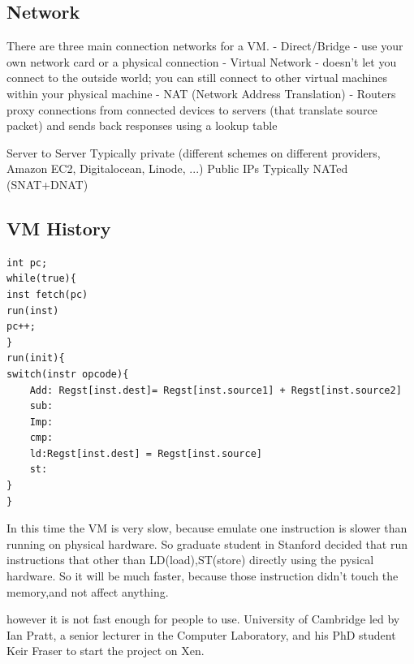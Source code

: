 \documentclass[fancy,11pt,titlestyle=display]{style/elegantbook}
\begin{document}
\subsection*{Network}

There are three main connection networks for a VM.
- Direct/Bridge - use your own network card or a physical connection
- Virtual Network - doesn't let you connect to the outside world; you can still connect to other virtual machines within your physical machine
- NAT (Network Address Translation) - Routers proxy connections from connected devices to servers (that translate source packet) and sends back responses using a lookup table

Server to Server
Typically private (different schemes on different providers, Amazon EC2, Digitalocean, Linode, ...)
Public IPs
Typically NATed (SNAT+DNAT)



\subsection{VM History}
\begin{lstlisting}
int pc;
while(true){
inst fetch(pc)
run(inst)
pc++;
}
run(init){
switch(instr opcode){
    Add: Regst[inst.dest]= Regst[inst.source1] + Regst[inst.source2]
    sub:
    Imp:
    cmp:
    ld:Regst[inst.dest] = Regst[inst.source]
    st: 
}
}
\end{lstlisting}
\par In this time the VM is very slow, because emulate one instruction is slower than running on physical hardware. So graduate student in Stanford decided that run instructions that other than LD(load),ST(store) directly using the pysical hardware. So it will be much faster, because those instruction didn't touch the memory,and not affect anything.
\*
\par however it is not fast enough for people to use. University of Cambridge led by Ian Pratt, a senior lecturer in the Computer Laboratory, and his PhD student Keir Fraser to start the project on Xen.




\par 
\end{document}

